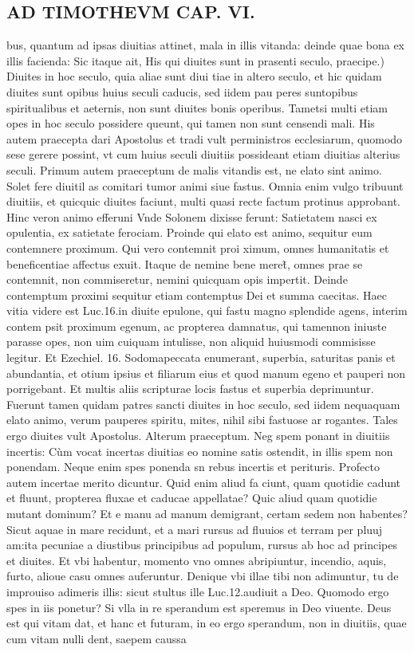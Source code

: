 \documentclass{article}
\begin{document}
\begin{pages}
\section*{AD TIMOTHEVM CAP. VI. }
\marginpar{[ p.132 ]}\pstart bus, quantum ad ipsas diuitias attinet, mala in illis vitanda: deinde quae bona ex illis facienda: Sic itaque ait,  \pend\pstart His qui diuites sunt in prasenti seculo, praecipe.) Diuites in hoc seculo, quia aliae sunt diui tiae in altero seculo, et hic quidam diuites sunt opibus huius seculi caducis, sed iidem pau peres suntopibus spiritualibus et aeternis, non sunt diuites bonis operibus. Tametsi multi etiam opes in hoc seculo possidere queunt, qui tamen non sunt censendi mali. His autem praecepta dari Apostolus et tradi vult perministros ecclesiarum, quomodo sese gerere possint, vt cum huius seculi diuitiis possideant etiam diuitias alterius seculi.  \pend\pstart Primum autem praeceptum de malis vitandis est, ne elato sint animo. Solet fere diuitil as comitari tumor animi siue fastus. Omnia enim vulgo tribuunt diuitiis, et quicquic diuites faciunt, multi quasi recte factum protinus approbant. Hinc veron animo efferuni Vnde Solonem dixisse ferunt: Satietatem nasci ex opulentia, ex satietate ferociam. Proinde qui elato est animo, sequitur eum contemnere proximum. Qui vero contemnit proi ximum, omnes humanitatis et beneficentiae affectus exuit. Itaque de nemine bene meret̃, omnes prae se contemnit, non commiseretur, nemini quicquam opis impertit. Deinde contemptum proximi sequitur etiam contemptus Dei et summa caecitas. Haec vitia videre est Luc.16.in diuite epulone, qui fastu magno splendide agens, interim contem psit proximum egenum, ac propterea damnatus, qui tamennon iniuste parasse opes, non uim cuiquam intulisse, non aliquid huiusmodi commisisse legitur. Et Ezechiel. 16. Sodomapeccata enumerant, superbia, saturitas panis et abundantia, et otium ipsius et filiarum eius et quod manum egeno et pauperi non porrigebant. Et multis aliis scripturae locis fastus et superbia deprimuntur. Fuerunt tamen quidam patres sancti diuites in hoc seculo, sed iidem nequaquam elato animo, verum pauperes spiritu, mites, nihil sibi fastuose ar rogantes. Tales ergo diuites vult Apostolus.  \pend\pstart Alterum praeceptum. Neg spem ponant in diuitiis incertis: Cùm vocat incertas diuitias eo nomine satis ostendit, in illis spem non ponendam. Neque enim spes ponenda sn rebus incertis et perituris. Profecto autem incertae merito dicuntur. Quid enim aliud fa ciunt, quam quotidie cadunt et fluunt, propterea fluxae et caducae appellatae? Quic aliud quam quotidie mutant dominum? Et e manu ad manum demigrant, certam sedem non habentes? Sicut aquae in mare recidunt, et a mari rursus ad fluuios et terram per pluuj am:ita pecuniae a diustibus principibus ad populum, rursus ab hoc ad principes et diuites. Et vbi habentur, momento vno omnes abripiuntur, incendio, aquis, furto, alioue casu omnes auferuntur. Denique vbi illae tibi non adimuntur, tu de improuiso adimeris illis: sicut stultus ille Luc.12.audiuit a Deo. Quomodo ergo spes in iis ponetur? Si vlla in re sperandum est speremus in Deo viuente. Deus est qui vitam dat, et hanc et futuram, in eo ergo sperandum, non in diuitiis, quae cum vitam nulli dent, saepem caussa 
\end{pages}
\end{document}
